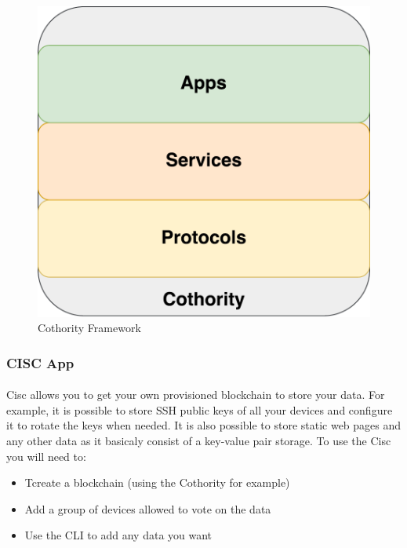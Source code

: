 \begin{figure}[h]
\includegraphics[scale=.5]{graphic/cothority.pdf}
\centering
\caption*{Cothority Framework}
\end{figure}

\subsubsection*{CISC App\raisebox{.3\baselineskip}{\normalsize\footnotemark}}

\paragraph{}
Cisc allows you to get your own provisioned blockchain to store your data. For example, it is possible to store SSH public keys of all your devices and configure it to rotate the keys when needed. It is also possible to store static web pages and any other data as it basicaly consist of a key-value pair storage. To use the Cisc you will need to:


\begin{itemize}
  \item Tcreate a blockchain (using the Cothority for example)
  \item Add a group of devices allowed to vote on the data
  \item Use the CLI to add any data you want
\end{itemize}

